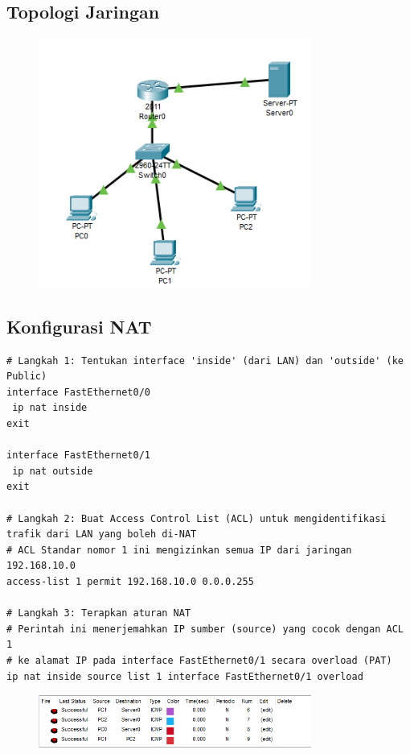 \subsection{Topologi Jaringan}
\begin{figure}[H]
\centering
\includegraphics[width=0.8\textwidth]{P1/img/3.png}
\end{figure}

\subsection{Konfigurasi NAT}
\begin{lstlisting}
# Langkah 1: Tentukan interface 'inside' (dari LAN) dan 'outside' (ke Public)
interface FastEthernet0/0
 ip nat inside
exit

interface FastEthernet0/1
 ip nat outside
exit

# Langkah 2: Buat Access Control List (ACL) untuk mengidentifikasi trafik dari LAN yang boleh di-NAT
# ACL Standar nomor 1 ini mengizinkan semua IP dari jaringan 192.168.10.0
access-list 1 permit 192.168.10.0 0.0.0.255

# Langkah 3: Terapkan aturan NAT
# Perintah ini menerjemahkan IP sumber (source) yang cocok dengan ACL 1
# ke alamat IP pada interface FastEthernet0/1 secara overload (PAT)
ip nat inside source list 1 interface FastEthernet0/1 overload
\end{lstlisting}
\begin{figure}[H]
\centering
\includegraphics[width=0.8\textwidth]{P1/img/2.png}
\end{figure}
